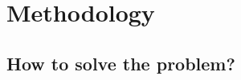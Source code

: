 \documentclass[12pt,letterpaper]{article}
\begin{document}

\section{Methodology}


\subsection{How to solve the problem?}
\end{document}
